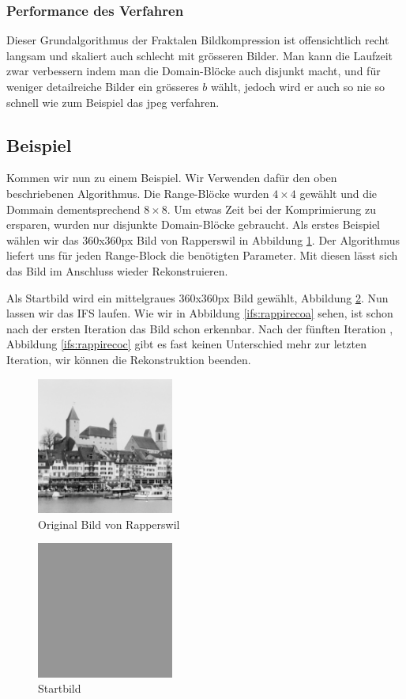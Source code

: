 \subsubsection{Performance des Verfahren}
Dieser Grundalgorithmus der Fraktalen Bildkompression ist offensichtlich recht langsam und skaliert auch schlecht mit grösseren Bilder.
Man kann die Laufzeit zwar verbessern indem man die Domain-Blöcke auch disjunkt macht, und für weniger detailreiche Bilder ein grösseres $b$ wählt, jedoch wird er auch so nie so schnell wie zum Beispiel das jpeg verfahren.

\subsection{Beispiel}
Kommen wir nun zu einem Beispiel.
Wir Verwenden dafür den oben beschriebenen Algorithmus.
Die Range-Blöcke wurden $4\times4$ gewählt und die Dommain dementsprechend $8\times8$.
Um etwas Zeit bei der Komprimierung zu ersparen, wurden nur disjunkte Domain-Blöcke gebraucht.
Als erstes Beispiel wählen wir das 360x360px Bild von Rapperswil in Abbildung \ref{ifs:original}.
Der Algorithmus liefert uns für jeden Range-Block die benötigten Parameter.
Mit diesen lässt sich das Bild im Anschluss wieder Rekonstruieren.

Als Startbild wird ein mittelgraues 360x360px Bild gewählt, Abbildung \ref{ifs:bild0}.
Nun lassen wir das IFS laufen.
Wie wir in Abbildung \ref{ifs:rappirecoa} sehen, ist schon nach der ersten Iteration das Bild schon erkennbar.
Nach der fünften Iteration , Abbildung \ref{ifs:rappirecoc} gibt es fast keinen Unterschied mehr zur letzten Iteration, wir können die Rekonstruktion beenden.
\begin{figure}	
	\centering
	\includegraphics[width=0.4\textwidth]{papers/ifs/images/original}
	\caption{Original Bild von Rapperswil}
	\label{ifs:original}
\end{figure}
\begin{figure}
	\centering
	\includegraphics[width=0.4\textwidth]{papers/ifs/images/rapperswil}
	\caption{Startbild}
	\label{ifs:bild0}
\end{figure}

